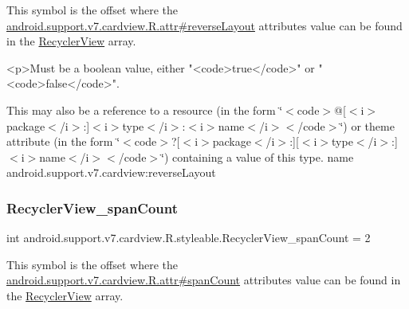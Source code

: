 This symbol is the offset where the \hyperlink{classandroid_1_1support_1_1v7_1_1cardview_1_1R_1_1attr_a8d57994b6f18c9cf3b202b8b54d95809}{android.\+support.\+v7.\+cardview.\+R.\+attr\#reverse\+Layout} attribute\textquotesingle{}s value can be found in the \hyperlink{classandroid_1_1support_1_1v7_1_1cardview_1_1R_1_1styleable_a65f321ce206d51d7c6ea76d7ea7bbb05}{Recycler\+View} array.

\begin{DoxyVerb}      <p>Must be a boolean value, either "<code>true</code>" or "<code>false</code>".
\end{DoxyVerb}
 

This may also be a reference to a resource (in the form \char`\"{}$<$code$>$@\mbox{[}$<$i$>$package$<$/i$>$\+:\mbox{]}$<$i$>$type$<$/i$>$\+:$<$i$>$name$<$/i$>$$<$/code$>$\char`\"{}) or theme attribute (in the form \char`\"{}$<$code$>$?\mbox{[}$<$i$>$package$<$/i$>$\+:\mbox{]}\mbox{[}$<$i$>$type$<$/i$>$\+:\mbox{]}$<$i$>$name$<$/i$>$$<$/code$>$\char`\"{}) containing a value of this type.  name android.\+support.\+v7.\+cardview\+:reverse\+Layout \mbox{\label{classandroid_1_1support_1_1v7_1_1cardview_1_1R_1_1styleable_a35481c2d84bd6e50d39d321c7dd041a6}} 
\subsubsection{\texorpdfstring{Recycler\+View\+\_\+span\+Count}{RecyclerView\_spanCount}}
{\footnotesize\ttfamily int android.\+support.\+v7.\+cardview.\+R.\+styleable.\+Recycler\+View\+\_\+span\+Count = 2\hspace{0.3cm}{\ttfamily [static]}}

This symbol is the offset where the \hyperlink{classandroid_1_1support_1_1v7_1_1cardview_1_1R_1_1attr_ab82ae971b854d4f764e718ce40d23e44}{android.\+support.\+v7.\+cardview.\+R.\+attr\#span\+Count} attribute\textquotesingle{}s value can be found in the \hyperlink{classandroid_1_1support_1_1v7_1_1cardview_1_1R_1_1styleable_a65f321ce206d51d7c6ea76d7ea7bbb05}{Recycler\+View} array.

